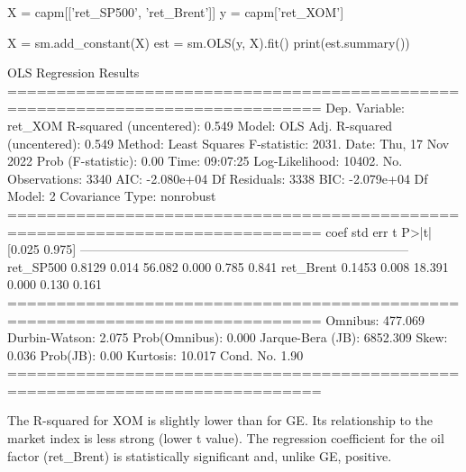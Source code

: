 \begin{ipython}
X = capm[['ret_SP500', 'ret_Brent']]
y = capm['ret_XOM']

X = sm.add_constant(X)
est = sm.OLS(y, X).fit()
print(est.summary())
\end{ipython} 
\begin{ioutput}
                           OLS Regression Results                                
==============================================================================
Dep. Variable:                ret_XOM   R-squared (uncentered):          0.549
Model:                            OLS   Adj. R-squared (uncentered):     0.549
Method:                 Least Squares   F-statistic:                     2031.
Date:                Thu, 17 Nov 2022   Prob (F-statistic):               0.00
Time:                        09:07:25   Log-Likelihood:                 10402.
No. Observations:                3340   AIC:                        -2.080e+04
Df Residuals:                    3338   BIC:                        -2.079e+04
Df Model:                           2                                                  
Covariance Type:            nonrobust                                                  
==============================================================================
                 coef    std err          t      P>|t|      [0.025      0.975]
------------------------------------------------------------------------------
ret_SP500      0.8129      0.014     56.082      0.000       0.785       0.841
ret_Brent      0.1453      0.008     18.391      0.000       0.130       0.161
==============================================================================
Omnibus:                      477.069   Durbin-Watson:                   2.075
Prob(Omnibus):                  0.000   Jarque-Bera (JB):             6852.309
Skew:                           0.036   Prob(JB):                         0.00
Kurtosis:                      10.017   Cond. No.                         1.90
==============================================================================
\end{ioutput}

The R-squared for XOM is slightly lower than for GE. Its relationship to the market index is less strong (lower t value).
The regression coefficient for the oil factor (ret\_Brent) is statistically significant and, unlike GE, positive.

